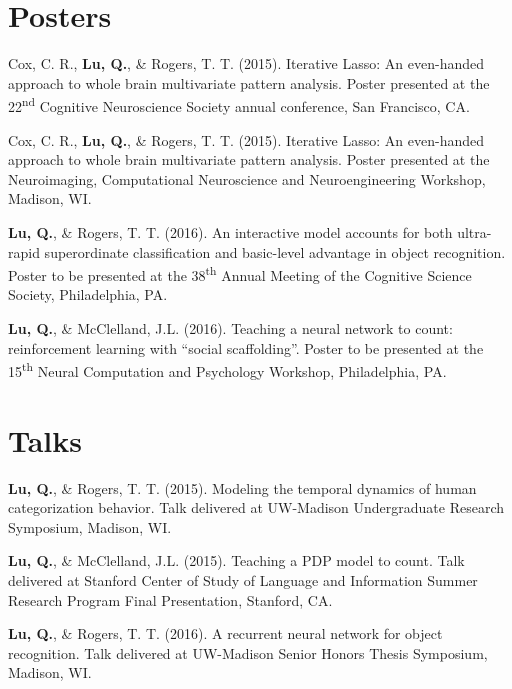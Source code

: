\documentclass[11pt,a4paper,sans]{moderncv}        %
\newcommand{\ts}{\textsuperscript}
\begin{document}
\section{Posters}
\hangindent=0.7cm
Cox, C. R., \textbf{Lu, Q.}, \& Rogers, T. T. (2015). Iterative Lasso: An even-handed approach to whole brain multivariate pattern analysis. Poster presented at the 22\ts{nd} Cognitive Neuroscience Society annual conference, San Francisco, CA.

\hangindent=0.7cm
Cox, C. R., \textbf{Lu, Q.}, \& Rogers, T. T. (2015). Iterative Lasso: An even-handed approach to whole brain multivariate pattern analysis. Poster presented at the Neuroimaging, Computational Neuroscience and Neuroengineering Workshop, Madison, WI.

\hangindent=0.7cm
\textbf{Lu, Q.}, \& Rogers, T. T. (2016). An interactive model accounts for both ultra-rapid superordinate classification and basic-level advantage in object recognition. Poster to be presented at the 38\ts{th} Annual Meeting of the Cognitive Science Society, Philadelphia, PA.

\hangindent=0.7cm
\textbf{Lu, Q.}, \& McClelland, J.L. (2016). Teaching a neural network to count: reinforcement learning with ``social scaffolding''. Poster to be presented at the 15\ts{th} Neural Computation and Psychology Workshop, Philadelphia, PA.


\section{Talks}
\hangindent=0.7cm
\textbf{Lu, Q.}, \& Rogers, T. T. (2015). Modeling the temporal dynamics of human categorization behavior. Talk delivered at UW-Madison Undergraduate Research Symposium, Madison, WI.

\hangindent=0.7cm
\textbf{Lu, Q.}, \& McClelland, J.L. (2015). Teaching a PDP model to count. Talk delivered at Stanford Center of Study of Language and Information Summer Research Program Final Presentation, Stanford, CA. 

\hangindent=0.7cm
\textbf{Lu, Q.}, \& Rogers, T. T. (2016). A recurrent neural network for object recognition. Talk delivered at UW-Madison Senior Honors Thesis Symposium, Madison, WI.
\end{document}
